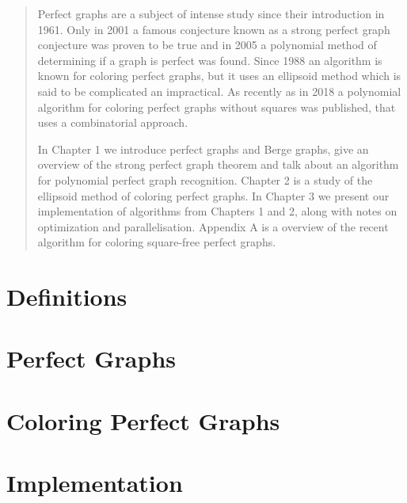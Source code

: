 \documentclass{report}
\author{Adrian Siwiec}
\date{\today{}}
\begin{document}

\pagebreak

\begin{abstract}
	Perfect graphs are a subject of intense study since their introduction in 1961. Only in 2001 a famous conjecture known as a strong perfect graph conjecture was proven to be true and in 2005 a polynomial method of determining if a graph is perfect was found. Since 1988 an algorithm is known for coloring perfect graphs, but it uses an ellipsoid method which is said to be complicated an impractical. As recently as in 2018 a polynomial algorithm for coloring perfect graphs without squares was published, that uses a combinatorial approach.

	In Chapter 1 we introduce perfect graphs and Berge graphs, give an overview of the strong perfect graph theorem and talk about an algorithm for polynomial perfect graph recognition. Chapter 2 is a study of the ellipsoid method of coloring perfect graphs. In Chapter 3 we present our implementation of algorithms from Chapters 1 and 2, along with notes on optimization and parallelisation. Appendix A is a overview of the recent algorithm for coloring square-free perfect graphs.
\end{abstract}

\listoftheorems[ignoreall,show={defn}]
\renewcommand{\listtheoremname}{List of algorithms}
\listoftheorems[ignoreall,show={alg}]
\tableofcontents

\pagebreak

\chapter*{Definitions}


\chapter{Perfect Graphs}


\chapter{Coloring Perfect Graphs}


\chapter{Implementation}



\appendix
\appendixpage
\addappheadtotoc



% 
\printbibliography

% 	
\end{document}
